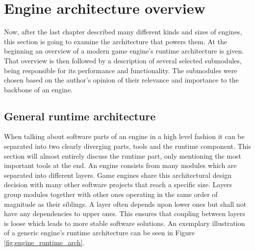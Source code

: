 \chapter{Engine architecture overview}

Now, after the last chapter described many different kinds and sizes of engines, this section is going to examine the architecture that powers them. At the beginning an overview of a modern game engine's runtime architecture is given. That overview is then followed by a description of several selected submodules, being responsible for its performance and functionality. The submodules were chosen based on the author's opinion of their relevance and importance to the backbone of an engine.

\section{General runtime architecture} \label{engine_runtime_arch}

When talking about software parts of an engine in a high level fashion it can be separated into two clearly diverging parts, tools and the runtime component. This section will almost entirely discuss the runtime part,  only mentioning the most important tools at the end. An engine consists from many modules which are separated into different layers. Game engines share this architectural design decision with many other software projects that reach a specific size. Layers group modules together with other ones operating in the same order of magnitude as their siblings. A layer often depends upon lower ones but shall not have any dependencies to upper ones. This ensures that coupling between layers is loose which leads to more stable software solutions. An exemplary illustration of a generic engine's runtime architecture can be seen in Figure \ref{fig:engine_runtime_arch}.

